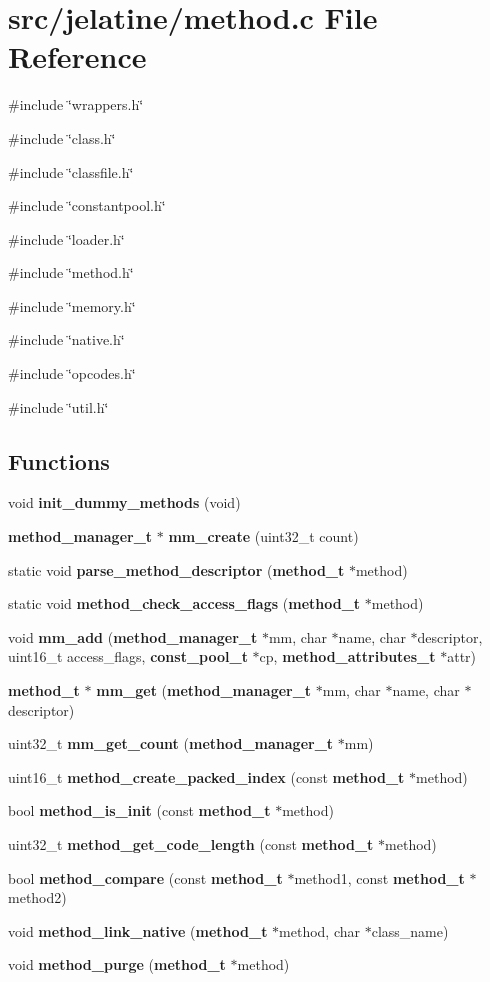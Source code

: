 \section{src/jelatine/method.c File Reference}
\label{method_8c}
{\ttfamily \#include \char`\"{}wrappers.h\char`\"{}}\par
{\ttfamily \#include \char`\"{}class.h\char`\"{}}\par
{\ttfamily \#include \char`\"{}classfile.h\char`\"{}}\par
{\ttfamily \#include \char`\"{}constantpool.h\char`\"{}}\par
{\ttfamily \#include \char`\"{}loader.h\char`\"{}}\par
{\ttfamily \#include \char`\"{}method.h\char`\"{}}\par
{\ttfamily \#include \char`\"{}memory.h\char`\"{}}\par
{\ttfamily \#include \char`\"{}native.h\char`\"{}}\par
{\ttfamily \#include \char`\"{}opcodes.h\char`\"{}}\par
{\ttfamily \#include \char`\"{}util.h\char`\"{}}\par
\subsection*{Functions}
\begin{DoxyCompactItemize}
\item 
void {\bf init\_\-dummy\_\-methods} (void)
\item 
{\bf method\_\-manager\_\-t} $\ast$ {\bf mm\_\-create} (uint32\_\-t count)
\item 
static void {\bf parse\_\-method\_\-descriptor} ({\bf method\_\-t} $\ast$method)
\item 
static void {\bf method\_\-check\_\-access\_\-flags} ({\bf method\_\-t} $\ast$method)
\item 
void {\bf mm\_\-add} ({\bf method\_\-manager\_\-t} $\ast$mm, char $\ast$name, char $\ast$descriptor, uint16\_\-t access\_\-flags, {\bf const\_\-pool\_\-t} $\ast$cp, {\bf method\_\-attributes\_\-t} $\ast$attr)
\item 
{\bf method\_\-t} $\ast$ {\bf mm\_\-get} ({\bf method\_\-manager\_\-t} $\ast$mm, char $\ast$name, char $\ast$descriptor)
\item 
uint32\_\-t {\bf mm\_\-get\_\-count} ({\bf method\_\-manager\_\-t} $\ast$mm)
\item 
uint16\_\-t {\bf method\_\-create\_\-packed\_\-index} (const {\bf method\_\-t} $\ast$method)
\item 
bool {\bf method\_\-is\_\-init} (const {\bf method\_\-t} $\ast$method)
\item 
uint32\_\-t {\bf method\_\-get\_\-code\_\-length} (const {\bf method\_\-t} $\ast$method)
\item 
bool {\bf method\_\-compare} (const {\bf method\_\-t} $\ast$method1, const {\bf method\_\-t} $\ast$method2)
\item 
void {\bf method\_\-link\_\-native} ({\bf method\_\-t} $\ast$method, char $\ast$class\_\-name)
\item 
void {\bf method\_\-purge} ({\bf method\_\-t} $\ast$method)
\end{DoxyCompactItemize}
